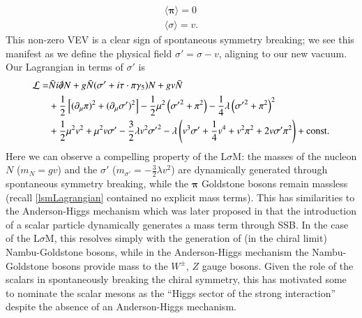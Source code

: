 \documentclass[aps,prd,onecolumn,showpacs,amsmath,amssymb,nofootinbib, 11pt]{revtex4} \pdfoutput=1
\newcommand{\lsm}{L$\sigma$M}
\begin{document}
\begin{gather}
    \langle \mathbf{\pi} \rangle = 0  \\
    \langle \sigma \rangle = v.
\end{gather}
This non-zero VEV is a clear sign of spontaneous symmetry breaking; we see this manifest as we define the physical field $\sigma'=\sigma -v$, aligning to our new vacuum. Our Lagrangian in terms of $\sigma'$ is
\begin{align}
    \label{lsmLagrangianSSB}
      \mathcal{L} = & \bar{N}i \slashed{\partial}N + g\bar{N}(\sigma' + i \mathbf{\tau \cdot \pi}\gamma_{5})N + gv\bar{N}\\ & +\frac{1}{2}\left[(\partial_{\mu}\mathbf{\pi})^{2}+(\partial_{\mu}\mathbf{\sigma'})^{2}\right]-\frac{1}{2}\mu^2\left({\sigma'}^2+\mathbf{\pi}^2\right) -\frac{1}{4}\lambda\left({\sigma'}^2+\mathbf{\pi}^2\right)^2\\
      & + \frac{1}{2}\mu^2 v^2 +\mu^2 v {\sigma'}- \frac{3}{2}\lambda v^2 {\sigma'}^2-\lambda\left(v^3 \sigma' + \frac{1}{4} v^4 +v^2\pi^2+ 2v {\sigma'}\pi^2 \right) + \mathrm{const.}
\end{align}
Here we can observe a compelling property of the \lsm: the masses of the nucleon $N$ ($m_N = gv$) and the $\sigma'$ ($m_{\sigma'} = -\frac{3}{2}\lambda v^2$) are dynamically generated through spontaneous symmetry breaking, while the $\mathbf{\pi}$ Goldstone bosons remain massless (recall \eqref{lsmLagrangian} contained no explicit mass terms). This has similarities to the Anderson-Higgs mechanism which was later proposed \cite{higgs1,higgs2,higgs3} in that the introduction of a scalar particle dynamically generates a mass term through SSB. In the case of the \lsm, this resolves simply with the generation of (in the chiral limit) Nambu-Goldstone bosons, while in the Anderson-Higgs mechanism the Nambu-Goldstone bosons provide mass to the $W^{\pm},\,Z$ gauge bosons. Given the role of the scalars in spontaneously breaking the chiral symmetry, this has motivated some to nominate the scalar mesons as the ``Higgs sector of the strong interaction'' \cite{Pennington2005,Schumacher2011}  despite the absence of an Anderson-Higgs mechanism.
\end{document}
